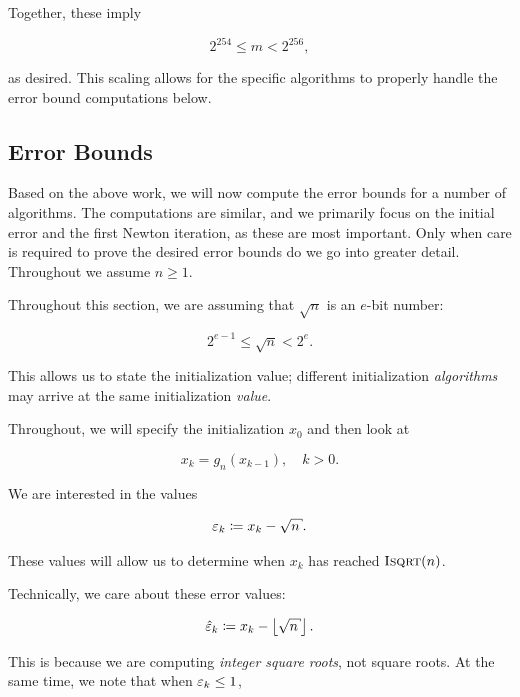 \noindent
Together, these imply

\begin{equation}
    2^{254} \le m < 2^{256},
\end{equation}

\noindent
as desired.
This scaling allows for the specific algorithms to properly
handle the error bound computations below.


\subsection{Error Bounds}

Based on the above work, we will now compute the error bounds
for a number of algorithms.
The computations are similar,
and we primarily focus on the initial error and the first Newton iteration,
as these are most important.
Only when care is required to prove the desired
error bounds do we go into greater detail.
Throughout we assume $n\ge1$.

Throughout this section, we are assuming that $\sqrt{n}$ is an $e$-bit number:

\begin{equation}
    2^{e-1}\le \sqrt{n} < 2^{e}.
\end{equation}

\noindent
This allows us to state the initialization value;
different initialization \emph{algorithms} may arrive at the same
initialization \emph{value}.

Throughout, we will specify the initialization $x_{0}$
and then look at

\begin{equation}
    x_{k} = g_{n}(x_{k-1}), \quad k>0.
\end{equation}

\noindent
We are interested in the values

\begin{equation}
    \eps_{k} \mathDef{} x_{k} - \sqrt{n}.
\end{equation}

\noindent
These values will allow us to determine when $x_{k}$ has reached
$\textsc{Isqrt}(n)$.

Technically, we care about these error values:

\begin{equation}
    \hat{\eps}_{k} \mathDef{} x_{k} - \floor{\sqrt{n}}.
\end{equation}

\noindent
This is because we are computing \emph{integer square roots},
not square roots.
At the same time, we note that when $\varepsilon_{k}\le1$,


